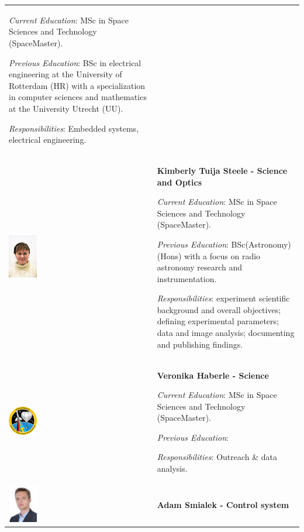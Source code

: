 \begin{longtable}[]{m{} m{}}
\smallskip
\textit{Current Education}: MSc in Space Sciences and Technology (SpaceMaster).

\smallskip
\textit{Previous Education}: BSc in electrical engineering at the University of Rotterdam (HR) with a specialization in computer sciences and mathematics at the University Utrecht (UU).

\smallskip
\textit{Responsibilities}: Embedded systems, electrical engineering.
\bigskip
\\

\includegraphics[width=0.2\textwidth]{0-cover/img/TEAMPICS/Kim_Final.jpg}  & \textbf{Kimberly Tuija Steele - Science and Optics}

\smallskip
\textit{Current Education}: MSc in Space Sciences and Technology (SpaceMaster).

\smallskip
\textit{Previous Education}: BSc(Astronomy)(Hons) with a focus on radio astronomy research and instrumentation.

\smallskip
\textit{Responsibilities}: experiment scientific background and overall objectives; defining experimental parameters; data and image analysis; documenting and publishing findings.

\bigskip
\\

\includegraphics[width=0.2\textwidth]{0-cover/img/logo-rexus-bexus.png}  & \textbf{Veronika Haberle - Science}

\smallskip
\textit{Current Education}: MSc in Space Sciences and Technology (SpaceMaster).

\smallskip
\textit{Previous Education}:

\smallskip
\textit{Responsibilities}: Outreach \& data analysis.
\bigskip
\\

\includegraphics[width=0.2\textwidth]{0-cover/img/TEAMPICS/Adam_final.jpg}  & \textbf{Adam Smialek - Control system}


\end{longtable}
